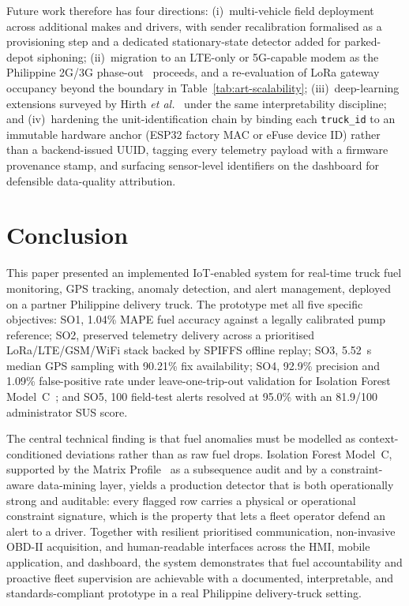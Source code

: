 \documentclass[10pt,journal]{IEEEtran}
\begin{document}
Future work therefore has four directions: (i)~multi-vehicle field deployment across additional makes and drivers, with sender recalibration formalised as a provisioning step and a dedicated stationary-state detector added for parked-depot siphoning; (ii)~migration to an LTE-only or 5G-capable modem as the Philippine 2G/3G phase-out~\cite{ntc2025legacy_network_phaseout} proceeds, and a re-evaluation of LoRa gateway occupancy beyond the boundary in Table~\ref{tab:art-scalability}; (iii)~deep-learning extensions surveyed by Hirth \textit{et al.}~\cite{hirth2025truck_survey} under the same interpretability discipline; and (iv)~hardening the unit-identification chain by binding each \texttt{truck\_id} to an immutable hardware anchor (ESP32 factory MAC or eFuse device ID) rather than a backend-issued UUID, tagging every telemetry payload with a firmware provenance stamp, and surfacing sensor-level identifiers on the dashboard for defensible data-quality attribution.

\section{Conclusion}
This paper presented an implemented IoT-enabled system for real-time truck fuel monitoring, GPS tracking, anomaly detection, and alert management, deployed on a partner Philippine delivery truck. The prototype met all five specific objectives: SO1, 1.04\% MAPE fuel accuracy against a legally calibrated pump reference; SO2, preserved telemetry delivery across a prioritised LoRa/LTE/GSM/WiFi stack backed by SPIFFS offline replay; SO3, 5.52~s median GPS sampling with 90.21\% fix availability; SO4, 92.9\% precision and 1.09\% false-positive rate under leave-one-trip-out validation for Isolation Forest Model~C~\cite{liu2008isolation_forest}; and SO5, 100 field-test alerts resolved at 95.0\% with an 81.9/100 administrator SUS score.

The central technical finding is that fuel anomalies must be modelled as context-conditioned deviations rather than as raw fuel drops. Isolation Forest Model~C, supported by the Matrix Profile~\cite{yeh2016matrix_profile} as a subsequence audit and by a constraint-aware data-mining layer, yields a production detector that is both operationally strong and auditable: every flagged row carries a physical or operational constraint signature, which is the property that lets a fleet operator defend an alert to a driver. Together with resilient prioritised communication, non-invasive OBD-II acquisition, and human-readable interfaces across the HMI, mobile application, and dashboard, the system demonstrates that fuel accountability and proactive fleet supervision are achievable with a documented, interpretable, and standards-compliant prototype in a real Philippine delivery-truck setting.
\end{document}

